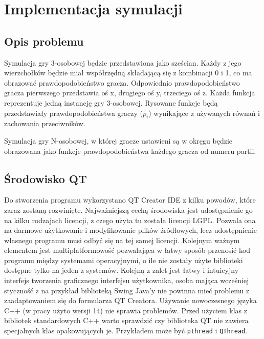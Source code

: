 \chapter{Implementacja symulacji}
\label{cha:implementacja}

\section{Opis problemu}
\label{sec:opis_problemu}
Symulacja gry 3-osobowej będzie przedstawiona jako sześcian. Każdy z jego wierzchołków będzie miał współrzędną składającą się z kombinacji 0 i 1, co ma obrazować prawdopodobieństwo gracza. Odpowiednio prawdopodobieństwo gracza pierwszego przedstawia oś x, drugiego oś y, trzeciego oś z. Każda funkcja reprezentuje jedną instancję gry 3-osobowej. Rysowane funkcje będą przedstawiały prawdopodobieństwa graczy ($p_i$) wynikające z używanych równań i zachowania przeciwników. 

Symulacja gry N-osobowej, w której gracze ustawieni są w okręgu będzie obrazowana jako funkcje prawdopodobieństwa każdego gracza od numeru partii.

\section{Środowisko QT}
\label{sec:qt}
Do stworzenia programu wykorzystano QT Creator IDE z kilku powodów, które zaraz zostaną rozwinięte. Najważniejszą cechą środowiska jest udostępnienie go na kilku rodzajach licencji, z czego użyta tu została licencji LGPL. Pozwala ona na darmowe użytkowanie i modyfikowanie plików źródłowych, lecz udostępnienie własnego programu musi odbyć się na tej samej licencji. Kolejnym ważnym elementem jest multiplatformowość pozwalająca w łatwy sposób przenosić kod programu między systemami operacyjnymi, o ile nie zostały użyte biblioteki dostępne tylko na jeden z systemów. Kolejną z zalet jest łatwy i intuicyjny interfejs tworzenia graficznego interfejsu użytkownika, osoba mająca wcześniej styczność z na przykład biblioteką Swing Java'y nie powinna mieć problemu z zaadaptowaniem się do  formularza QT Creatora. Używanie nowoczesnego języka C++ (w pracy użyto wersji 14) nie sprawia problemów. Przed użyciem klas z bibliotek standardowych C++ warto sprawdzić czy biblioteka QT nie zawiera specjalnych klas opakowujących je. Przykładem może być \texttt{pthread} i \texttt{QThread}.

